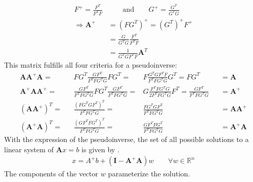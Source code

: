\documentclass{report}
\begin{document}
\begin{align}
	F^+ = \frac{F^T}{F^TF}& \qquad \text{and} \qquad G^+ = \frac{G^T}{G^TG} \\
	\Rightarrow \mathbf{A}^+ &= \left(FG^T\right)^+ = \left(G^T\right)^+F^+ \\
	                &= \frac{G}{G^TG}\frac{F^T}{F^TF} \\
	                & = \frac{1}{G^TGF^TF}\mathbf{A}^T
\end{align}
This matrix fulfills all four criteria for a pseudoinverse: 
\begin{align}
	\mathbf{A}\mathbf{A}^+\mathbf{A} =&& FG^T\frac{GF^T}{F^TFG^TG}FG^T =& F\frac{G^TGF^TF}{F^TFG^TG}G^T = FG^T &&= \mathbf{A}  \\
	\mathbf{A}^+\mathbf{A}\mathbf{A}^+ =&& \frac{GF^T}{F^TFG^TG}FG^T\frac{GF^T}{F^TFG^TG} =& G\frac{F^TFG^TG}{2F^TFG^TG}F^T = \frac{GF^T}{F^TFG^TG} &&= \mathbf{A}^+ \\
	(\mathbf{A}\mathbf{A}^+)^T =&& \frac{\left(FG^TGF^T\right)^T}{F^TFG^TG} =& \frac{FG^TGF^T}{F^TFG^TG} &&= \mathbf{A}\mathbf{A}^+ \\
	(\mathbf{A}^+\mathbf{A})^T =&& \frac{\left(GF^TFG^T\right)^T}{F^TFG^TG} =& \frac{GF^TFG^T}{F^TFG^TG} &&= \mathbf{A}^+\mathbf{A}
\end{align}
With the expression of the pseudoinverse, the set of all possible solutions to a linear system of $\mathbf{A}x=b$ is given by \cite{generalizedInverseSolutionSet}.
\begin{align}
	x = A^+b + \left(\mathbf{I}-\mathbf{A}^+\mathbf{A}\right)w \qquad \forall w\in\mathbb{R}^n
\end{align}
The components of the vector $w$ parameterize the solution. 
\end{document}

